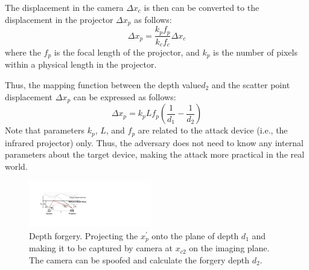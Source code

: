 The displacement in the camera $\Delta x_c$ is then can be converted to the displacement in the projector $\Delta x_p$ as follows:
\begin{equation}
	\Delta x_p = \frac{k_pf_p}{k_cf_c}\Delta x_c 
	\label{xc_to_xp}
\end{equation}
where the $f_p$ is the focal length of the projector, and $k_p$ is the number of pixels within a physical length in the projector.

Thus, the mapping function between the depth value$d_2$ and the scatter point displacement $\Delta x_p$ can be expressed as follows:
\begin{equation}
	\Delta x_p = k_pLf_p(\frac{1}{d_1} - \frac{1}{d_2}) 
	\label{xp_to_d}
\end{equation}
Note that parameters $k_p$, $L$, and $f_p$ are related to the attack device (i.e., the infrared projector) only. Thus, the adversary does not need to know any internal parameters about the target device, making the attack more practical in the real world. 

\begin{figure}[!t]
	\centering
	\includegraphics[width=0.475\textwidth]{figures/depth_forgery.pdf} 
	\vspace{-0.1in}
	\caption{Depth forgery. Projecting the $x_{p}^{'}$ onto the plane of depth $d_1$ and making it to be captured by camera at $x_{c2}$ on the imaging plane. The camera can be spoofed and calculate the forgery depth $d_2$.}
	\label{depth_forgery}
	\vspace{-0.15in}
\end{figure}


